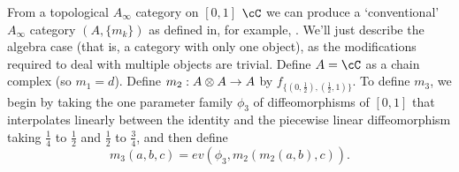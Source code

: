 {%

From a topological $A_\infty$ category on $[0,1]$ $\cC$ we can produce a `conventional' 
$A_\infty$ category $(A, \{m_k\})$ as defined in, for example, \cite{MR1854636}.
We'll just describe the algebra case (that is, a category with only one object), 
as the modifications required to deal with multiple objects are trivial.
Define $A = \cC$ as a chain complex (so $m_1 = d$).
Define $m_2 : A\otimes A \to A$ by $f_{\{(0,\frac{1}{2}),(\frac{1}{2},1)\}}$.
To define $m_3$, we begin by taking the one parameter family $\phi_3$ of diffeomorphisms 
of $[0,1]$ that interpolates linearly between the identity and the piecewise linear 
diffeomorphism taking $\frac{1}{4}$ to $\frac{1}{2}$ and $\frac{1}{2}$ to $\frac{3}{4}$, and then define
\begin{equation*}
m_3(a,b,c) = ev(\phi_3, m_2(m_2(a,b), c)).
\end{equation*}

}
